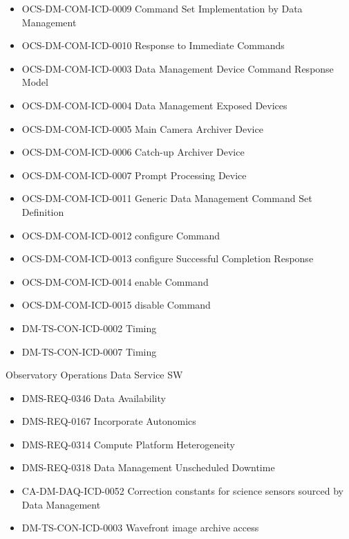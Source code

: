 \begin{itemize}
\item OCS-DM-COM-ICD-0009 Command Set Implementation by Data Management
\item OCS-DM-COM-ICD-0010 Response to Immediate Commands
\item OCS-DM-COM-ICD-0003 Data Management Device Command Response Model
\item OCS-DM-COM-ICD-0004 Data Management Exposed Devices
\item OCS-DM-COM-ICD-0005 Main Camera Archiver Device
\item OCS-DM-COM-ICD-0006 Catch-up Archiver Device
\item OCS-DM-COM-ICD-0007 Prompt Processing Device
\item OCS-DM-COM-ICD-0011 Generic Data Management Command Set Definition
\item OCS-DM-COM-ICD-0012 configure Command
\item OCS-DM-COM-ICD-0013 configure Successful Completion Response
\item OCS-DM-COM-ICD-0014 enable Command
\item OCS-DM-COM-ICD-0015 disable Command
\item DM-TS-CON-ICD-0002 Timing
\item DM-TS-CON-ICD-0007 Timing
\end{itemize}
Observatory Operations Data Service SW \begin{itemize}
\item DMS-REQ-0346 Data Availability
\item DMS-REQ-0167 Incorporate Autonomics
\item DMS-REQ-0314 Compute Platform Heterogeneity
\item DMS-REQ-0318 Data Management Unscheduled Downtime
\item CA-DM-DAQ-ICD-0052 Correction constants for science sensors sourced by Data Management
\item DM-TS-CON-ICD-0003 Wavefront image archive access
\end{itemize}
